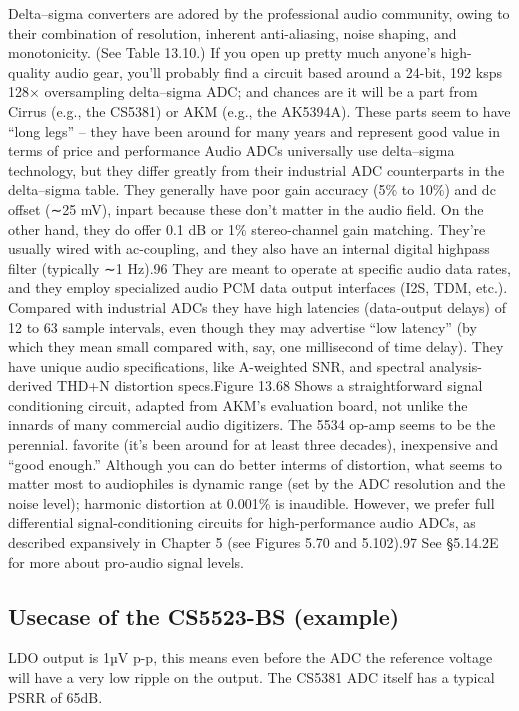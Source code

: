 Delta–sigma converters are adored by the professional audio community, owing to their combination of resolution, inherent anti-aliasing, noise shaping, and monotonicity. (See Table 13.10.) If you open up pretty much anyone’s high-quality audio gear, you’ll probably find a circuit based around a 24-bit, 192 ksps 128× oversampling delta–sigma ADC; and chances are it will be a part from Cirrus (e.g., the CS5381) or AKM (e.g., the AK5394A). These parts seem to have “long legs” – they have been around for many years and represent good value in terms of price and performance Audio ADCs universally use delta–sigma technology, but they differ greatly from their industrial ADC counterparts in the delta–sigma table. They generally have poor gain accuracy (5\% to 10\%) and dc offset (∼25 mV), inpart because these don’t matter in the audio field. On the other hand, they do offer 0.1 dB or 1\% stereo-channel gain matching. They’re usually wired with ac-coupling, and they also have an internal digital highpass filter (typically ∼1 Hz).96 They are meant to operate at specific audio data rates, and they employ specialized audio PCM data output interfaces (I2S, TDM, etc.). Compared with industrial ADCs they have high latencies (data-output delays) of 12 to 63 sample intervals, even though they may advertise “low latency” (by which they mean small compared with, say, one millisecond of time delay). They have unique audio specifications, like A-weighted SNR, and spectral analysis-derived THD+N distortion specs.Figure 13.68 Shows a straightforward signal conditioning circuit, adapted from AKM’s evaluation board, not unlike the innards of many commercial audio digitizers. The 5534 op-amp seems to be the perennial. favorite (it’s been around for at least three decades), inexpensive and “good enough.” Although you can do better interms of distortion, what seems to matter most to audiophiles is dynamic range (set by the ADC resolution and the noise level); harmonic distortion at 0.001\% is inaudible. However, we prefer full differential signal-conditioning circuits for high-performance audio ADCs, as described expansively in Chapter 5 (see Figures 5.70 and 5.102).97 See §5.14.2E for more about pro-audio signal levels.\\

        \subsection{Usecase of the CS5523-BS (example)}
        LDO output is 1µV p-p, this means even before the ADC the reference voltage will have a very low ripple on the output. The CS5381 ADC itself has a typical PSRR of 65dB. \\
